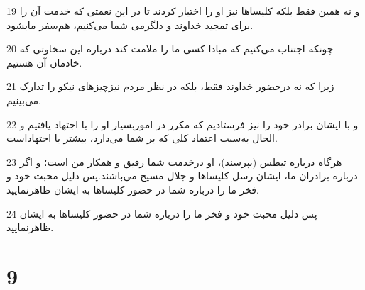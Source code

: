 \par 19 و نه همین فقط بلکه کلیساها نیز او را اختیار کردند تا در این نعمتی که خدمت آن را برای تمجید خداوند و دلگرمی شما می‌کنیم، هم‌سفر مابشود.
\par 20 چونکه اجتناب می‌کنیم که مبادا کسی ما را ملامت کند درباره این سخاوتی که خادمان آن هستیم.
\par 21 زیرا که نه درحضور خداوند فقط، بلکه در نظر مردم نیزچیزهای نیکو را تدارک می‌بینیم.
\par 22 و با ایشان برادر خود را نیز فرستادیم که مکرر در اموربسیار او را با اجتهاد یافتیم و الحال به‌سبب اعتماد کلی که بر شما می‌دارد، بیشتر با اجتهاداست.
\par 23 هرگاه درباره تیطس (بپرسند)، او درخدمت شما رفیق و همکار من است؛ و اگر درباره برادران ما، ایشان رسل کلیساها و جلال مسیح می‌باشند.پس دلیل محبت خود و فخر ما را درباره شما در حضور کلیساها به ایشان ظاهرنمایید.
\par 24 پس دلیل محبت خود و فخر ما را درباره شما در حضور کلیساها به ایشان ظاهرنمایید.

\chapter{9}

